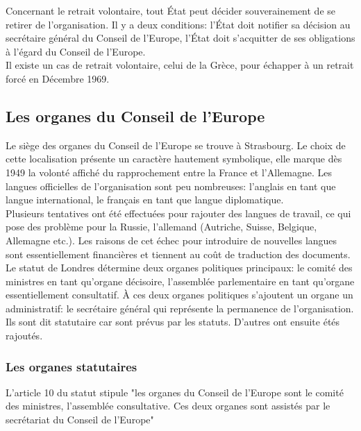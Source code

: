 \documentclass[10pt, a4paper, openany]{book}
\begin{document}
Concernant le retrait volontaire, tout État peut décider souverainement de se retirer de l'organisation. Il y a deux conditions: l'État doit notifier sa décision au secrétaire général du Conseil de l'Europe, l'État doit s'acquitter de ses obligations à l'égard du Conseil de l'Europe. \\
Il existe un cas de retrait volontaire, celui de la Grèce, pour échapper à un retrait forcé en Décembre 1969. 

\subsection{Les organes du Conseil de l'Europe}

Le siège des organes du Conseil de l'Europe se trouve à Strasbourg. Le choix de cette localisation présente un caractère hautement symbolique, elle marque dès 1949 la volonté affiché du rapprochement entre la France et l'Allemagne. Les langues officielles de l'organisation sont peu nombreuses: l'anglais en tant que langue international, le français en tant que langue diplomatique. \\
Plusieurs tentatives ont été effectuées pour rajouter des langues de travail, ce qui pose des problème pour la Russie, l'allemand (Autriche, Suisse, Belgique, Allemagne etc.). Les raisons de cet échec pour introduire de nouvelles langues sont essentiellement financières et tiennent au coût de traduction des documents. \\
Le statut de Londres détermine deux organes politiques principaux: le comité des ministres en tant qu'organe décisoire, l'assemblée parlementaire en tant qu'organe essentiellement consultatif. À ces deux organes politiques s'ajoutent un organe un administratif: le secrétaire général qui représente la permanence de l'organisation. Ils sont dit statutaire car sont prévus par les statuts. D'autres ont ensuite étés rajoutés.

\subsubsection{Les organes statutaires}

L'article 10 du statut stipule "les organes du Conseil de l'Europe sont le comité des ministres, l'assemblée consultative. Ces deux organes sont assistés par le secrétariat du Conseil de l'Europe"
\end{document}
